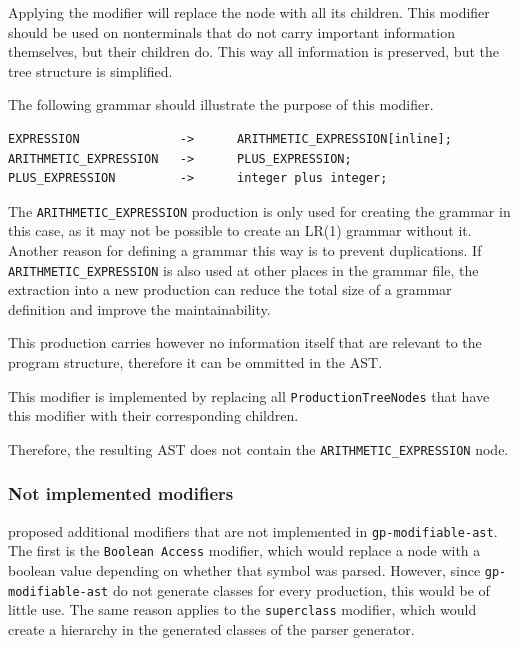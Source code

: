 Applying the modifier will replace the node with all its children. 
This modifier should be used on nonterminals that do not carry important information themselves, but their children do. 
This way all information is preserved, but the tree structure is simplified.

The following grammar should illustrate the purpose of this modifier.

\begin{lstlisting}[caption=inline modifier example grammar]
EXPRESSION              ->      ARITHMETIC_EXPRESSION[inline];
ARITHMETIC_EXPRESSION   ->      PLUS_EXPRESSION;
PLUS_EXPRESSION         ->      integer plus integer;
\end{lstlisting}

The \lstinline{ARITHMETIC_EXPRESSION} production is only used for creating the grammar in this case, as it may not be possible to create an LR(1) grammar without it.
Another reason for defining a grammar this way is to prevent duplications. If \lstinline{ARITHMETIC_EXPRESSION} is also used at other places in the grammar file,
the extraction into a new production can reduce the total size of a grammar definition and improve the maintainability.

This production carries however no information itself that are relevant to the program structure, therefore it can be ommitted in the AST.

This modifier is implemented by replacing all \verb|ProductionTreeNodes| that have this modifier with their corresponding children.

Therefore, the resulting AST does not contain the \lstinline{ARITHMETIC_EXPRESSION} node.

\subsubsection{Not implemented modifiers}

\cite{GeneratingRewritableAST} proposed additional modifiers that are not implemented in \verb|gp-modifiable-ast|.
The first is the \verb|Boolean Access| modifier, which would replace a node with a boolean value depending on whether that symbol was parsed. 
However, since \verb|gp-modifiable-ast| do not generate classes for every production, this would be of little use.
The same reason applies to the \verb|superclass| modifier, which would create a hierarchy in the generated classes of the parser generator.
